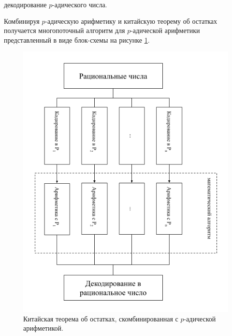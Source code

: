 \documentclass[master, och, diploma, times]{sty/SCWorks}
\theoremstyle{plain}
\theoremstyle{definition}
\numberwithin{equation}{section}
\begin{document}
\begin{algorithm}
\DontPrintSemicolon %
\caption{декодирование $p$-адического числа.}
\label{algo:decoding}
\end{algorithm}

Комбинируя $p$-адическую арифметику и китайскую теорему об остатках получается многопоточный алгоритм для $p$-адической арифметики представленный в виде блок-схемы на рисунке \ref{img:multi:schema}.

\begin{figure}[H]
\centerline{\includegraphics[width=0.7\linewidth]{images/multi/schema.png}}
\caption{Китайская теорема об остатках, скомбинированная с $p$-адической арифметикой.}
\label{img:multi:schema}
\end{figure}
\end{document}
